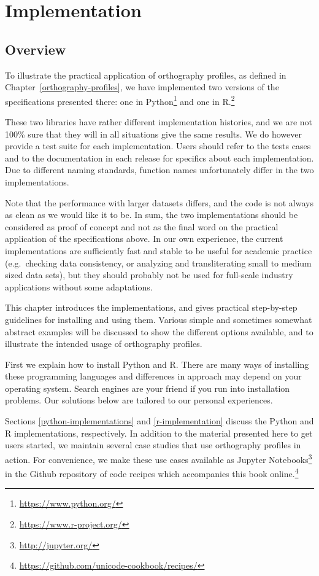 \chapter{Implementation}
\label{implementation}

\section{Overview}
To illustrate the practical application of orthography profiles, as defined in
Chapter~\ref{orthography-profiles}, we have implemented two 
versions of the specifications presented there: one in Python\footnote{\url{https://www.python.org/}} and one
in R.\footnote{\url{https://www.r-project.org/}}

These two libraries have rather different implementation histories,
and we are not 100\% sure that they will in all situations give the same
results. We do however provide a test suite for each implementation. 
Users should refer to the tests cases and to the documentation in each release 
for specifics about each implementation. Due to different naming standards, 
function names unfortunately differ in the two implementations.

Note that the performance with larger datasets differs, and the code is not
always as clean as we would like it to be. In sum, the two implementations
should be considered as proof of concept and not as the final word on the
practical application of the specifications above. In our own experience, the
current implementations are sufficiently fast and stable to be useful for
academic practice (e.g.\ checking data consistency, or analyzing and
transliterating small to medium sized data sets), but they should probably 
not be used for full-scale industry applications without some adaptations.

This chapter introduces the implementations, and gives practical step-by-step 
guidelines for installing and using them. Various simple and sometimes 
somewhat abstract examples will be discussed to show the different options 
available, and to illustrate the intended usage of orthography profiles. 

First we explain how to install Python and  R. There are many ways of installing these programming languages and differences in approach may depend on your operating system. Search engines are your friend if you run into installation problems. Our solutions below are tailored to our personal experiences.

Sections \ref{python-implementations} and \ref{r-implementation} discuss the Python and R implementations, 
respectively. In addition to the material presented here to get users started, we maintain 
several case studies that use orthography profiles in action. For convenience, 
we make these use cases available as Jupyter Notebooks\footnote{\url{http://jupyter.org/}} 
in the Github repository of code recipes which accompanies this book online.\footnote{\url{https://github.com/unicode-cookbook/recipes/}}


